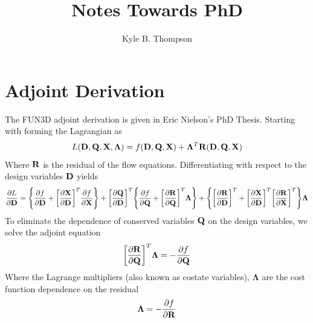 \documentclass{article}   	%
\title{Notes Towards PhD}
\author{Kyle B. Thompson}
\begin{document}
\maketitle
\section{Adjoint Derivation}

The FUN3D adjoint derivation is given in Eric Nielson's PhD Thesis.  Starting
with forming the Lagrangian as
\begin{equation}
  L(\mathbf D,\mathbf Q,\mathbf X,\mathbf{\Lambda})=f(\mathbf D,\mathbf Q,\mathbf X)
  +\mathbf{\Lambda}^T\mathbf R(\mathbf D,\mathbf Q,\mathbf X)
\end{equation}
Where $\mathbf R$ is the residual of the flow equations.  Differentiating with respect
to the design variables $\mathbf D$ yields
\begin{equation}
  \frac{\partial L}{\partial \mathbf D}=
  \Bigg\{\frac{\partial f}{\partial \mathbf D}+\bigg[\frac{\partial \mathbf X}{\partial \mathbf D}\bigg]^T \frac{\partial f}{\partial \mathbf X}\Bigg\}
  +\bigg[\frac{\partial \mathbf Q}{\partial \mathbf D}\bigg]^T
  \Bigg\{\frac{\partial f}{\partial \mathbf Q}+\bigg[\frac{\partial \mathbf R}{\partial \mathbf Q}\bigg]^T \mathbf{\Lambda}\Bigg\}
  +\Bigg\{\bigg[\frac{\partial \mathbf R}{\partial \mathbf D}\bigg]^T
  +\bigg[\frac{\partial \mathbf X}{\partial \mathbf D}\bigg]^T\bigg[\frac{\partial \mathbf R}{\partial \mathbf X}\bigg]^T\Bigg\}\mathbf{\Lambda}
  \label{dL}
\end{equation}
To eliminate the dependence of conserved variables $\mathbf Q$ on the design
variables, we solve the adjoint equation
\begin{equation}
  \bigg[\frac{\partial \mathbf R}{\partial \mathbf Q}\bigg]^T\mathbf{\Lambda}=
  -\frac{\partial f}{\partial \mathbf Q}
  \label{adjoint-main}
\end{equation}
Where the Lagrange multipliers (also known as costate variables),
$\mathbf{\Lambda}$ are the cost function dependence on the residual
\begin{equation}
  \mathbf{\Lambda}=-\frac{\partial f}{\partial \mathbf R}
\end{equation}
\end{document}
